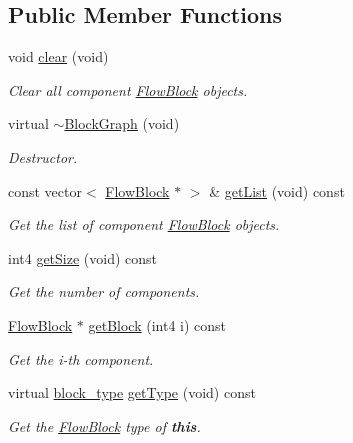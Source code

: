 \subsection*{Public Member Functions}
\begin{DoxyCompactItemize}
\item 
void \mbox{\hyperlink{class_block_graph_a1220886c0c0cad9c8f482afe53dba5d4}{clear}} (void)
\begin{DoxyCompactList}\small\item\em Clear all component \mbox{\hyperlink{class_flow_block}{Flow\+Block}} objects. \end{DoxyCompactList}\item 
virtual \mbox{\hyperlink{class_block_graph_abfd6feefb295ef518337a4715992f533}{$\sim$\+Block\+Graph}} (void)
\begin{DoxyCompactList}\small\item\em Destructor. \end{DoxyCompactList}\item 
const vector$<$ \mbox{\hyperlink{class_flow_block}{Flow\+Block}} $\ast$ $>$ \& \mbox{\hyperlink{class_block_graph_a48c7e5338645dcbc38521bf1722dd728}{get\+List}} (void) const
\begin{DoxyCompactList}\small\item\em Get the list of component \mbox{\hyperlink{class_flow_block}{Flow\+Block}} objects. \end{DoxyCompactList}\item 
int4 \mbox{\hyperlink{class_block_graph_a12bc7480ffcc4c163a2a2cd800742f09}{get\+Size}} (void) const
\begin{DoxyCompactList}\small\item\em Get the number of components. \end{DoxyCompactList}\item 
\mbox{\hyperlink{class_flow_block}{Flow\+Block}} $\ast$ \mbox{\hyperlink{class_block_graph_ac87b63ceb9f08a4f8667da43e25c7e5e}{get\+Block}} (int4 i) const
\begin{DoxyCompactList}\small\item\em Get the i-\/th component. \end{DoxyCompactList}\item 
virtual \mbox{\hyperlink{class_flow_block_a70df78390870fcdd51e31426ba6a193e}{block\+\_\+type}} \mbox{\hyperlink{class_block_graph_a8e542e109e0acc977218ceaf3c248153}{get\+Type}} (void) const
\begin{DoxyCompactList}\small\item\em Get the \mbox{\hyperlink{class_flow_block}{Flow\+Block}} type of {\bfseries{this}}. \end{DoxyCompactList}\item 

\end{DoxyCompactItemize}
